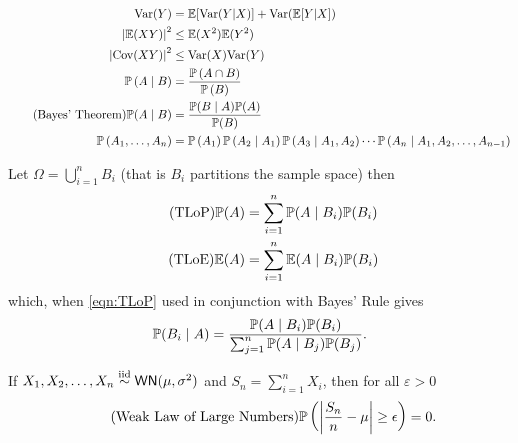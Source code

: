 \begin{align}
    \Var(Y)                               & = \Em [\Var(Y | X)]+\Var(\Em[Y | X])\vspace{-4mm}                                                                                                              \\
    \left| \Em (X Y) \right|^2            & \leq \Em (X^2) \Em (Y^2)                                                                                                                                       \\
    \left| \Cov (X Y) \right|^2           & \leq \Var (X) \Var (Y)                                                                                                                                         \\
    \Pm \left( A \mid B \right)           & = \frac{\Pm \left( A \cap B \right)}{\Pm \left( B \right)}                                                                                                     \\
    \tag{Bayes' Theorem} \Pm (A \mid B)   & = \frac{\Pm (B \mid A) \Pm (A)}{\Pm (B)}                                                                                                                       \\
    \Pm \left( A_1 , \ldots , A_n \right) & = \Pm \left( A_1 \right) \Pm \left( A_2 \mid A_1 \right) \Pm \left( A_3 \mid A_1 , A_2 \right) \cdots \Pm \left( A_n \mid A_1 , A_2 , \ldots , A_{n-1} \right) \\
\end{align}

Let $\Omega = \bigcup\limits_{i=1}^{n} B_{i}$ (that is $B_{i}$ partitions the sample space) then
\begin{align}
    \tag{TLoP} {\mathbb{P}} (A) & = \sum_{i=1}^{n} {\mathbb{P}} (A\mid B_i) {\mathbb{P}} (B_i) \label{eqn:TLoP} \\
    \tag{TLoE} {\mathbb{E}} (A) & = \sum_{i=1}^{n} {\mathbb{E}} (A\mid B_i) {\mathbb{P}} (B_i)
\end{align}
which, when \ref{eqn:TLoP} used in conjunction with Bayes' Rule gives
\begin{equation}
    {\mathbb{P}} (B_i \mid A) = \frac{{\mathbb{P}} (A\mid B_i) {\mathbb{P}} (B_i)}{\sum_{j=1}^{n} {\mathbb{P}} (A\mid B_j) {\mathbb{P}} (B_j)}.
\end{equation}

\vspace{1cm}

If $X_1 , X_2 , \ldots , X_n \overset{\text{iid}}{\sim} {\sf WN} (\mu,\sigma^2)$ and $S_n = \sum_{i=1}^{n} X_i$, then for all $\varepsilon > 0$
\begin{equation}
    \tag{Weak Law of Large Numbers} {\mathbb{P}} \left( \left| \frac{S_n}{n} -\mu \right| \geq \epsilon \right) = 0 .
\end{equation}


